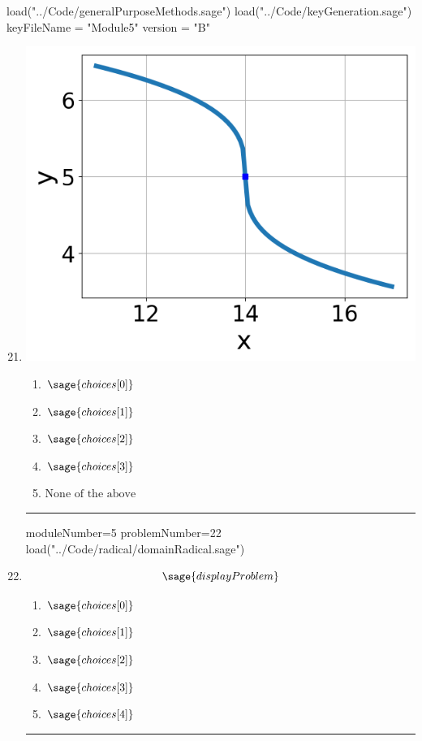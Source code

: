 \documentclass[14pt]{article}
\newcommand{\litem}[1]{\item#1\hspace*{-1cm}\rule{\textwidth}{0.4pt}}
\begin{document}
\pagestyle{fancy}

\begin{sagesilent}
load("../Code/generalPurposeMethods.sage")
load("../Code/keyGeneration.sage")
keyFileName = "Module5"
version = "B"
\end{sagesilent}

\begin{enumerate}
\setcounter{enumi}{20}


\begin{sagesilent}
moduleNumber=5
problemNumber=21
load("../Code/radical/radicalGraphToEquation.sage")
\end{sagesilent}

\litem{
\begin{multicols}{2}
\begin{center}
\includegraphics[width=.3\textwidth]{../Figures/radicalGraphToEquationB.png}
\end{center}

\columnbreak

	\begin{enumerate}[label=\Alph*.]
		\item \( \sage{choices[0]} \)
		\item \( \sage{choices[1]} \)
		\item \( \sage{choices[2]} \)
		\item \( \sage{choices[3]} \)
    \item \( \text{None of the above} \)
	\end{enumerate}
\end{multicols}
}

\begin{sagesilent}
moduleNumber=5
problemNumber=22
load("../Code/radical/domainRadical.sage")
\end{sagesilent}

\litem{ 

	\[ \sage{displayProblem} \]
	\begin{enumerate}[label=\Alph*.]
		\item \( \sage{choices[0]} \)
		\item \( \sage{choices[1]} \)
		\item \( \sage{choices[2]} \)
		\item \( \sage{choices[3]} \)
		\item \( \sage{choices[4]} \)
	\end{enumerate}
}


\end{enumerate}
\end{document}

